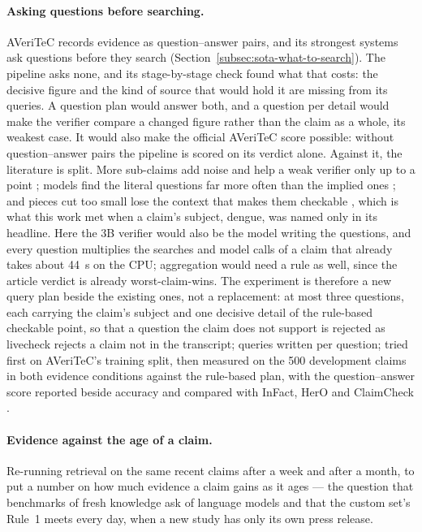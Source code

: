 \paragraph{Asking questions before searching.} AVeriTeC records evidence
as question--answer pairs, and its strongest systems ask questions before
they search (Section~\ref{subsec:sota-what-to-search}). The pipeline
asks none, and its stage-by-stage check found what that costs: the
decisive figure and the kind of source that would hold it are missing
from its queries. A question plan would answer both, and a question
per detail would make the verifier compare a changed figure rather than
the claim as a whole, its weakest case. It would also make the official
AVeriTeC score possible: without question--answer pairs the pipeline is
scored on its verdict alone. Against it, the literature is split. More
sub-claims add noise and help a weak verifier only up to a point
\cite{hu2025decomposition}; models find the literal questions far more
often than the implied ones \cite{chen2022claimdecomp}; and pieces cut
too small lose the context that makes them checkable
\cite{gunjal2024molecular}, which is what this work met when a claim's
subject, dengue, was named only in its headline. Here the 3B verifier
would also be the model writing the questions, and every question
multiplies the searches and model calls of a claim that already takes
about 44~s on the CPU; aggregation would need a rule as well, since the
article verdict is already worst-claim-wins. The experiment is
therefore a new query plan beside the existing ones, not a replacement:
at most three questions, each carrying the claim's subject and one
decisive detail of the rule-based checkable point, so that a question
the claim does not support is rejected as livecheck rejects a claim not
in the transcript; queries written per question; tried first on
AVeriTeC's training split, then measured on the 500 development claims
in both evidence conditions against the rule-based plan, with the
question--answer score reported beside accuracy and compared with
InFact, HerO and ClaimCheck
\cite{rothermel2024infact,yoon2024hero,putta2025claimcheck}.

\paragraph{Evidence against the age of a claim.} Re-running retrieval on
the same recent claims after a week and after a month, to put a number
on how much evidence a claim gains as it ages --- the question that
benchmarks of fresh knowledge ask of language models \cite{vu2024freshllms}
and that the custom set's Rule~1 meets every day, when a new study has
only its own press release.

